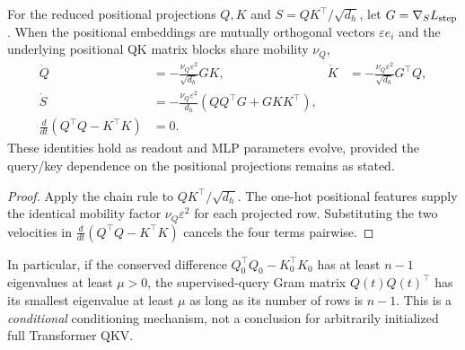 \begin{lrlemma}
\label{lem:lr-qk-geometry}
For the reduced positional projections $Q,K$ and
$S=QK^\top/\sqrt{d_h}$, let $G=\nabla_SL_{\mathrm{step}}$.
When the positional embeddings are mutually orthogonal vectors
$\varepsilon e_i$ and the underlying positional QK matrix blocks share
mobility $\nu_Q$,
\begin{align}
 \dot Q&=-\frac{\nu_Q\varepsilon^2}{\sqrt{d_h}}GK,
 &\dot K&=-\frac{\nu_Q\varepsilon^2}{\sqrt{d_h}}G^\top Q,\label{eq:lr-qk-flow}\\
 \dot S&=-\frac{\nu_Q\varepsilon^2}{d_h}
 (QQ^\top G+GKK^\top),\label{eq:lr-qk-scoreflow}\\
 \frac{d}{dt}(Q^\top Q-K^\top K)&=0.\label{eq:lr-balanced-conservation}
\end{align}
These identities hold as readout and MLP parameters evolve, provided the
query/key dependence on the positional projections remains as stated.
\end{lrlemma}
\begin{proof}
Apply the chain rule to $QK^\top/\sqrt{d_h}$.  The one-hot positional
features supply the identical mobility factor $\nu_Q\varepsilon^2$ for
each projected row.  Substituting the two velocities in
$\frac{d}{dt}(Q^\top Q-K^\top K)$ cancels the four terms pairwise.
\end{proof}

In particular, if the conserved difference
$Q_0^\top Q_0-K_0^\top K_0$ has at least $n-1$ eigenvalues at least
$\mu>0$, the supervised-query Gram matrix $Q(t)Q(t)^\top$ has its
smallest eigenvalue at least $\mu$ as long as its number of rows is $n-1$.
This is a \emph{conditional} conditioning mechanism, not a conclusion for
arbitrarily initialized full Transformer QKV.

